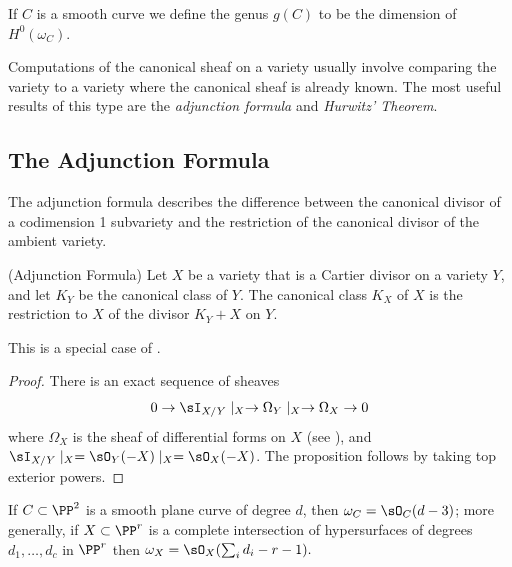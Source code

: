 \begin{definition}
If $C$ is a smooth curve we define the genus $g(C)$ to be the dimension of $H^0(\omega_C)$.
\end{definition}

Computations of the canonical sheaf on a variety usually involve comparing the variety to a variety where the canonical sheaf is already known. The most useful results of this type are  the \emph{adjunction formula}
and \emph{Hurwitz' Theorem}. 

\subsection{The Adjunction Formula}\label{Adjunction Formula}

The adjunction formula describes the difference between the canonical divisor of
a codimension 1 subvariety and the restriction of the canonical divisor of the ambient variety.

\begin{proposition}\label{adjunction}(Adjunction Formula)
 Let $X$ be a variety that is a Cartier divisor on a variety $Y$, and let $K_{Y}$ be the canonical class of $Y$. The canonical class $K_X$ of $X$ is
 the restriction to $X$ of the divisor $K_{Y}+X$ on $Y$.
\end{proposition}
This is a special case of \cite[****]{H}.
\begin{proof}
 There is an exact sequence of sheaves
 $$
0\to  \sI_{X/Y}\mid_{X} \to \Omega_{Y}\mid _{X} \to \Omega_{X} \to 0
 $$
 where $\Omega_{X}$ is the sheaf of differential forms on $X$ (see \cite[Theorem ***]{Eisenbud95}), and
$ \sI_{X/Y}\mid_{X} = \sO_{Y}(-X)\mid_{X} = \sO_{X}(-X)$. The proposition follows by taking top exterior powers.
\end{proof}

\begin{corollary}\label{canonical of plane curve}
If $C\subset \PP^{2}$ is a smooth plane curve of degree $d$, then $\omega_{C} = \sO_{C}(d-3)$; more generally, if
$X\subset \PP^{r}$ is a complete intersection of hypersurfaces of degrees $d_{1},\dots, d_{c}$ in $\PP^r$ then
$\omega_{X} = \sO_{X}(\sum_{i}d_{i }-r-1).$
\end{corollary}

